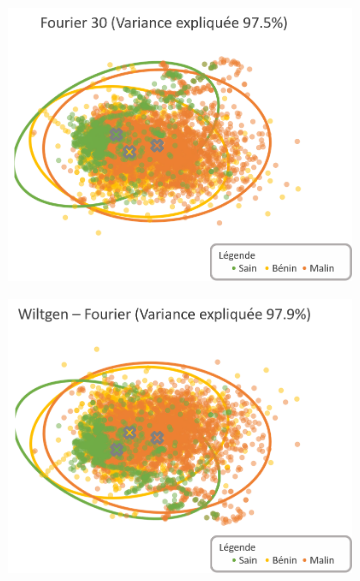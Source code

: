 \begin{figure}[p]
    \begin{subfigure}{.49\textwidth}
      \includegraphics[width=\textwidth]{contents/chapter_5/resources/visualisation_frequency_Fourier30.png}
    \end{subfigure}
    \begin{subfigure}{.49\textwidth}
      \includegraphics[width=\textwidth]{contents/chapter_5/resources/visualisation_frequency_WiltgenFourier.png}
    \end{subfigure}\vspace{10mm}
    

\end{figure}
